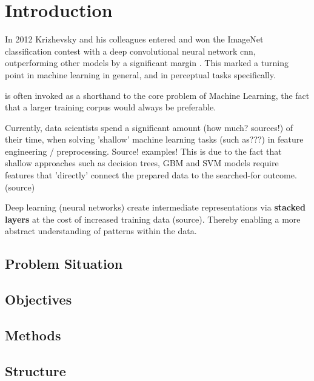 \chapter{Introduction}

In 2012 Krizhevsky and his colleagues entered and won the ImageNet classification contest with a deep convolutional neural network \ac{cnn}, outperforming other models by a significant margin \cite{krizhevsky2012imagenet}. This marked a turning point in machine learning in general, and in perceptual tasks specifically. 

\cite{norvig_eod} is often invoked as a shorthand to the core problem of Machine Learning, the fact that a larger training corpus would always be preferable.

Currently, data scientists spend a significant amount (how much? sources!) of their time, when solving 'shallow' machine learning tasks (such as???) in feature engineering / preprocessing. Source! examples!
This is due to the fact that shallow approaches such as decision trees, GBM and SVM models require features that 'directly' connect the prepared data to the searched-for outcome. (source) 

Deep learning (neural networks) create intermediate representations via \textbf{stacked layers} at the cost of increased training data (source). 
Thereby enabling a more abstract understanding of patterns within the data.

\citet{Shearer2000}

\section{Problem Situation}


\section{Objectives}


\section{Methods}


\section{Structure}

